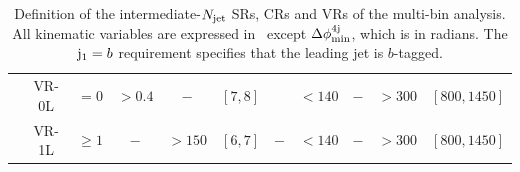 \begin{landscape}
\begin{table}[htbp]
\begin{tabular}{c c c c c c c c c c c}
			& VR-0L 	& $= 0$  		& $>0.4$ 		& $-$ 		& $[7,8]$		& \cmark		& $<140$ 				& $-$ 		& $> 300 $ 				& $[800,1450]$ \\
			& VR-1L 	& $\ge 1$  	& $-$ 		& $> 150$ 	& $[6,7]$		& $-$		& $<140$				& $-$ 		& $> 300 $  				& $[800,1450]$ \\
      			\bottomrule
    		\end{tabular}
    \caption{Definition of the intermediate-$N_{\mathrm{jet}}$ SRs, CRs and VRs of the multi-bin analysis. All kinematic variables are
                          expressed in \gev\ except $\Delta\phi_{\rm{min}}^{4{\rm{j}}}$, which is in radians. The $\mathrm{j}_1 = b$  requirement specifies that 
                          the leading jet is $b$-tagged.}
 	\end{table}
\end{landscape}


